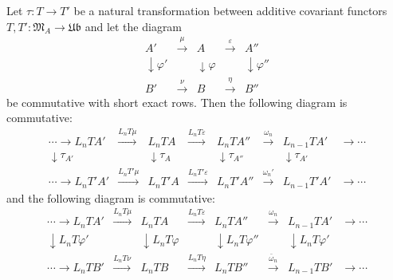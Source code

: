 \begin{proposition}
Let $\tau: T \rightarrow T'$ be a natural transformation between additive covariant functors $T, T': \mathfrak{M}_A \rightarrow \mathfrak{Ub}$ and let the diagram
\[
\begin{array}{ccccc}
A' & \xrightarrow{\mu} & A & \xrightarrow{\varepsilon} & A'' \\
\downarrow\scriptstyle{\varphi'} & & \downarrow\scriptstyle{\varphi} & & \downarrow\scriptstyle{\varphi''} \\
B' & \xrightarrow{\nu} & B & \xrightarrow{\eta} & B''
\end{array}
\]
be commutative with short exact rows. Then the following diagram is commutative:
\[
\begin{array}{ccccccc}
\cdots \rightarrow L_n T A' & \xrightarrow{L_n T \mu} & L_n T A & \xrightarrow{L_n T \varepsilon} & L_n T A'' & \xrightarrow{\omega_n} & L_{n-1} T A' & \rightarrow \cdots \\
\downarrow\scriptstyle{\tau_{A'}} & & \downarrow\scriptstyle{\tau_A} & & \downarrow\scriptstyle{\tau_{A''}} & & \downarrow\scriptstyle{\tau_{A'}} \\
\cdots \rightarrow L_n T' A' & \xrightarrow{L_n T' \mu} & L_n T' A & \xrightarrow{L_n T' \varepsilon} & L_n T' A'' & \xrightarrow{\omega_n'} & L_{n-1} T' A' & \rightarrow \cdots
\end{array}
\]
and the following diagram is commutative:
\[
\begin{array}{ccccccc}
\cdots \rightarrow L_n T A' & \xrightarrow{L_n T \mu} & L_n T A & \xrightarrow{L_n T \varepsilon} & L_n T A'' & \xrightarrow{\omega_n} & L_{n-1} T A' & \rightarrow \cdots \\
\downarrow\scriptstyle{L_n T \varphi'} & & \downarrow\scriptstyle{L_n T \varphi} & & \downarrow\scriptstyle{L_n T \varphi''} & & \downarrow\scriptstyle{L_n T \varphi'} \\
\cdots \rightarrow L_n T B' & \xrightarrow{L_n T \nu} & L_n T B & \xrightarrow{L_n T \eta} & L_n T B'' & \xrightarrow{\bar{\omega}_n} & L_{n-1} T B' & \rightarrow \cdots
\end{array}
\]
\end{proposition}
